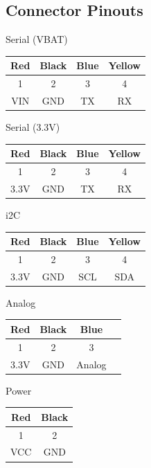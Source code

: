 \documentclass[12pt]{article}
\begin{document}
\subsection{Connector Pinouts}
Serial (VBAT)

\begin{tabular}{|c|c|c|c|}
\hline
Red & Black & Blue & Yellow \\
\hline
1 & 2 & 3 & 4 \\
\hline
VIN & GND & TX & RX \\
\hline
\end{tabular}
\vspace{1em}

\noindent Serial (3.3V)

\begin{tabular}{|c|c|c|c|}
\hline
Red & Black & Blue & Yellow \\
    \hline
1 & 2 & 3 & 4 \\
    \hline
3.3V & GND & TX & RX \\
    \hline
\end{tabular}
\vspace{1em}

\noindent i2C

\begin{tabular}{|c|c|c|c|}
\hline
Red & Black & Blue & Yellow \\
\hline
1 & 2 & 3 & 4 \\
\hline
3.3V & GND & SCL & SDA\\
\hline
\end{tabular}
\vspace{1em}

\noindent Analog

\begin{tabular}{|c|c|c|c|}
    \hline
    Red & Black & Blue \\
    \hline
    1 & 2 & 3 \\
    \hline
    3.3V & GND & Analog \\
    \hline
\end{tabular}
\vspace{1em}

\noindent Power

\begin{tabular}{|c|c|}
\hline
Red & Black \\
\hline
1 & 2 \\
\hline
VCC & GND \\
\hline
\end{tabular}
\vspace{1em}
\end{document}
